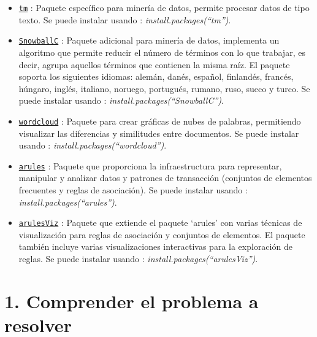 \documentclass[spanish,]{article}
\begin{document}
\begin{itemize}
\item
  \href{https://cran.r-project.org/web/packages/tm/tm.pdf}{\texttt{tm}}
  : Paquete específico para minería de datos, permite procesar datos de
  tipo texto. Se puede instalar usando :
  \emph{install.packages(``tm'')}.
\item
  \href{https://cran.r-project.org/web/packages/SnowballC/SnowballC.pdf}{\texttt{SnowballC}}
  : Paquete adicional para minería de datos, implementa un algoritmo que
  permite reducir el número de términos con lo que trabajar, es decir,
  agrupa aquellos términos que contienen la misma raíz. El paquete
  soporta los siguientes idiomas: alemán, danés, español, finlandés,
  francés, húngaro, inglés, italiano, noruego, portugués, rumano, ruso,
  sueco y turco. Se puede instalar usando :
  \emph{install.packages(``SnowballC'')}.
\item
  \href{https://cran.r-project.org/web/packages/wordcloud/wordcloud.pdf}{\texttt{wordcloud}}
  : Paquete para crear gráficas de nubes de palabras, permitiendo
  visualizar las diferencias y similitudes entre documentos. Se puede
  instalar usando : \emph{install.packages(``wordcloud'')}.
\item
  \href{https://cran.r-project.org/web/packages/arules/arules.pdf}{\texttt{arules}}
  : Paquete que proporciona la infraestructura para representar,
  manipular y analizar datos y patrones de transacción (conjuntos de
  elementos frecuentes y reglas de asociación). Se puede instalar usando
  : \emph{install.packages(``arules'')}.
\item
  \href{https://cran.r-project.org/web/packages/arulesViz/arulesViz.pdf}{\texttt{arulesViz}}
  : Paquete que extiende el paquete `arules' con varias técnicas de
  visualización para reglas de asociación y conjuntos de elementos. El
  paquete también incluye varias visualizaciones interactivas para la
  exploración de reglas. Se puede instalar usando :
  \emph{install.packages(``arulesViz'')}.
\end{itemize}

\newpage

\hypertarget{comprender-el-problema-a-resolver}{%
\section{1. Comprender el problema a
resolver}\label{comprender-el-problema-a-resolver}}
\end{document}
